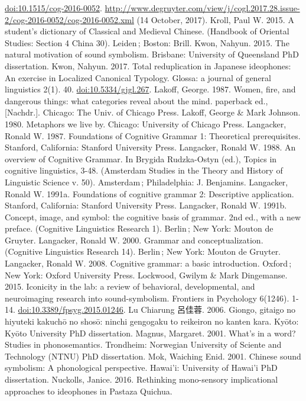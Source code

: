 \documentclass[12pt,article,oneside]{memoir}
\theoremstyle{definition}
\theoremstyle{definition}
\theoremstyle{definition}
\theoremstyle{remark}
\begin{document}
\url{doi:10.1515/cog-2016-0052}.
\url{http://www.degruyter.com/view/j/cogl.2017.28.issue-2/cog-2016-0052/cog-2016-0052.xml}
(14 October, 2017). Kroll, Paul W. 2015. A student's dictionary of
Classical and Medieval Chinese. (Handbook of Oriental Studies: Section 4
China 30). Leiden\,; Boston: Brill. Kwon, Nahyun. 2015. The natural
motivation of sound symbolism. Brisbane: University of Queensland PhD
dissertation. Kwon, Nahyun. 2017. Total reduplication in Japanese
ideophones: An exercise in Localized Canonical Typology. Glossa: a
journal of general linguistics 2(1). 40. \url{doi:10.5334/gjgl.267}.
Lakoff, George. 1987. Women, fire, and dangerous things: what categories
reveal about the mind. paperback ed., {[}Nachdr.{]}. Chicago: The Univ.
of Chicago Press. Lakoff, George \& Mark Johnson. 1980. Metaphors we
live by. Chicago: University of Chicago Press. Langacker, Ronald W.
1987. Foundations of Cognitive Grammar 1: Theoretical prerequisites.
Stanford, California: Stanford University Press. Langacker, Ronald W.
1988. An overview of Cognitive Grammar. In Brygida Rudzka-Ostyn (ed.),
Topics in cognitive linguistics, 3-48. (Amsterdam Studies in the Theory
and History of Linguistic Science v. 50). Amsterdam\,; Philadelphia: J.
Benjamins. Langacker, Ronald W. 1991a. Foundations of cognitive grammar
2: Descriptive application. Stanford, California: Stanford University
Press. Langacker, Ronald W. 1991b. Concept, image, and symbol: the
cognitive basis of grammar. 2nd ed., with a new preface. (Cognitive
Linguistics Research 1). Berlin\,; New York: Mouton de Gruyter.
Langacker, Ronald W. 2000. Grammar and conceptualization. (Cognitive
Linguistics Research 14). Berlin\,; New York: Mouton de Gruyter.
Langacker, Ronald W. 2008. Cognitive grammar: a basic introduction.
Oxford\,; New York: Oxford University Press. Lockwood, Gwilym \& Mark
Dingemanse. 2015. Iconicity in the lab: a review of behavioral,
developmental, and neuroimaging research into sound-symbolism. Frontiers
in Psychology 6(1246). 1-14. \url{doi:10.3389/fpsyg.2015.01246}. Lu
Chiarung 呂佳蓉. 2006. Giongo, gitaigo no hiyuteki kakuchō no shosō:
ninchi gengogaku to reikeiron no kanten kara. Kyōto: Kyōto University
PhD dissertation. Magnus, Margaret. 2001. What's in a word? Studies in
phonosemantics. Trondheim: Norwegian University of Sciente and
Technology (NTNU) PhD dissertation. Mok, Waiching Enid. 2001. Chinese
sound symbolism: A phonological perspective. Hawai'i: University of
Hawai'i PhD dissertation. Nuckolls, Janice. 2016. Rethinking
mono-sensory implicational approaches to ideophones in Pastaza Quichua.
\end{document}
